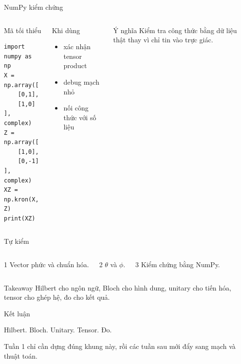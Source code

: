 \documentclass{beamer}
\begin{document}
\begin{frame}[fragile]{NumPy kiểm chứng}
  \begin{columns}[T,onlytextwidth]
    \begin{block}{Mã tối thiểu}
      \begingroup\scriptsize
\begin{verbatim}
import numpy as np
X = np.array([
    [0,1],
    [1,0]
], complex)
Z = np.array([
    [1,0],
    [0,-1]
], complex)
XZ = np.kron(X, Z)
print(XZ)
\end{verbatim}
      \endgroup
    \end{block}
    \begin{block}{Khi dùng}
      \begin{itemize}
        \item xác nhận tensor product
        \item debug mạch nhỏ
        \item nối công thức với số liệu
      \end{itemize}
    \end{block}
    \begin{exampleblock}{Ý nghĩa}
      Kiểm tra công thức bằng dữ liệu thật thay vì chỉ tin vào trực giác.
    \end{exampleblock}
  \end{columns}
\end{frame}

\begin{frame}{Tự kiểm}
  \begin{columns}[T,onlytextwidth]
    \begin{block}{1}
      Vector phức và chuẩn hóa.
    \end{block}
    \begin{block}{2}
      $\theta$ và $\phi$.
    \end{block}
    \begin{block}{3}
      Kiểm chứng bằng NumPy.
    \end{block}
  \end{columns}

  \vspace{0.35em}
  \begin{exampleblock}{Takeaway}
    Hilbert cho ngôn ngữ, Bloch cho hình dung, unitary cho tiến hóa, tensor cho ghép hệ, đo cho kết quả.
  \end{exampleblock}
\end{frame}

\begin{frame}{Kết luận}
  \begin{center}
    \vfill
    {\displayfont\fontsize{26}{30}\selectfont Hilbert. Bloch. Unitary. Tensor. Đo.\par}
    \vspace{0.75em}
    {\normalsize\color{AppleMuted}Tuần 1 chỉ cần dựng đúng khung này, rồi các tuần sau mới đẩy sang mạch và thuật toán.\par}
    \vfill
  \end{center}
\end{frame}
\end{document}

